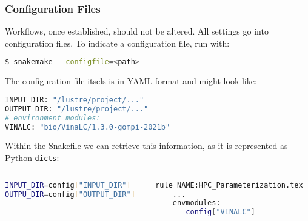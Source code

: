\begin{frame}[fragile]
  \frametitle{Configuration Files}
  Workflows, once established, should not be altered. All settings go into configuration files. To indicate a configuration file, run with:
  \begin{lstlisting}[language=Bash,style=Shell]
$ snakemake --configfile=<path>
  \end{lstlisting}\pause
  The configuration file itsels is in YAML format and might look like:
  \begin{lstlisting}[language=Python,style=Python]
INPUT_DIR: "/lustre/project/..."
OUTPUT_DIR: "/lustre/project/..."
# environment modules:
VINALC: "bio/VinaLC/1.3.0-gompi-2021b"
  \end{lstlisting}\pause
    Within the Snakefile we can retrieve this information, as it is represented as Python \texttt{dicts}:
  \begin{columns}
     \begin{column}{0.5\textwidth}
       \begin{lstlisting}[language=Bash,style=Shell,basicstyle=\small]
INPUT_DIR=config["INPUT_DIR"]
OUTPU_DIR=config["OUTPUT_DIR"]
       \end{lstlisting}
     \end{column}
     \begin{column}{0.5\textwidth}
      \begin{lstlisting}[language=Bash,style=Shell,basicstyle=\small] 
rule NAME:HPC_Parameterization.tex
    ...
    envmodules:
       config["VINALC"]    
      \end{lstlisting}

     \end{column}
  \end{columns}

\end{frame}
